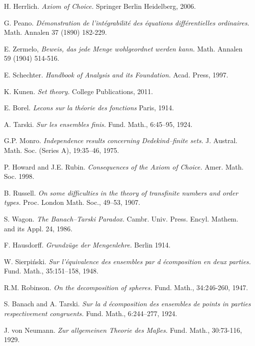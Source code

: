 \documentclass[12pt,a4paper]{report}
\theoremstyle{definition}
\theoremstyle{num.custom-title}
\begin{document}
\begin{thebibliography}{3}

H. Herrlich. \emph{Axiom of Choice.} Springer Berlin Heidelberg, 2006.

G. Peano. \emph{Démonstration de l'intégrabilité des équations différentielles ordinaires.} Math. Annalen 37 (1890) 182-229.

E. Zermelo, \emph{Beweis, das jede Menge wohlgeordnet werden kann.} Math. Annalen 59 (1904) 514-516.

E. Schechter. \emph{Handbook of Analysis and its Foundation.} Acad. Press, 1997.

K. Kunen. \emph{Set theory.} College Publications, 2011.

E. Borel. \emph{Lecons sur la théorie des fonctions} Paris, 1914.

A. Tarski. \emph{Sur les ensembles finis.} Fund. Math., 6:45–95, 1924.

G.P. Monro. \emph{Independence results concerning Dedekind–finite sets.} J. Austral. Math. Soc. (Series A), 19:35–46, 1975.

P. Howard and J.E. Rubin. \emph{Consequences of the Axiom of Choice.} Amer. Math. Soc. 1998.

B. Russell. \emph{On some difficulties in the theory of transfinite numbers and order types.} Proc. London Math. Soc., 49–53, 1907.

S. Wagon. \emph{The Banach–Tarski Paradox.} Cambr. Univ. Press. Encyl. Mathem. and its Appl. 24, 1986.

F. Hausdorff. \emph{Grundzüge der Mengenlehre.} Berlin 1914.

W. Sierpiński. \emph{Sur l'équivalence des ensembles par d écomposition en deux parties.} Fund. Math., 35:151–158, 1948.

R.M. Robinson. \emph{On the decomposition of spheres.} Fund. Math., 34:246-260, 1947.

S. Banach and A. Tarski. \emph{Sur la d écomposition des ensembles de points in parties respectivement congruents.} Fund. Math., 6:244–277, 1924.

J. von Neumann. \emph{Zur allgemeinen Theorie des Maßes.} Fund. Math., 30:73-116, 1929.


\end{thebibliography}
\end{document}
